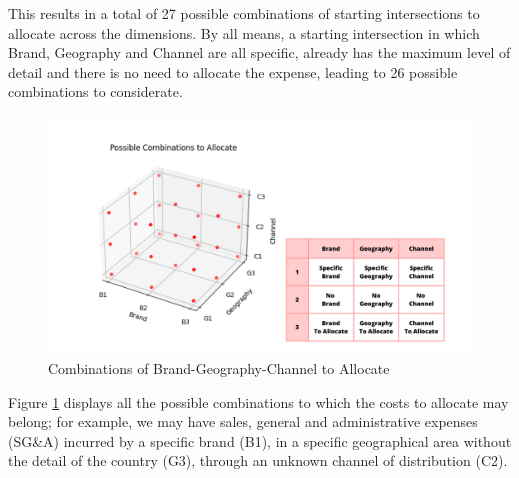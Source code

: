 \documentclass[12pt,a4paper,openright,twoside]{book}
\begin{document}
This results in a total of 27 possible combinations of starting intersections to allocate across the dimensions.
%
By all means, a starting intersection in which Brand, Geography and Channel are all specific, already has the maximum level of detail and there is no need to allocate the expense, leading to 26 possible combinations to considerate.

\begin{figure}[htbp]
	\centering
	\includegraphics[width=\linewidth]{figures/combinations.pdf}
	\caption{Combinations of Brand-Geography-Channel to Allocate}
	\label{fig:combos}
\end{figure}

Figure \ref{fig:combos} displays all the possible combinations to which the costs to allocate may belong; for example, we may have sales, general and administrative expenses (SG\&A) incurred by a specific brand (B1), in a specific geographical area without the detail of the country (G3), through an unknown channel of distribution (C2).
\end{document}
